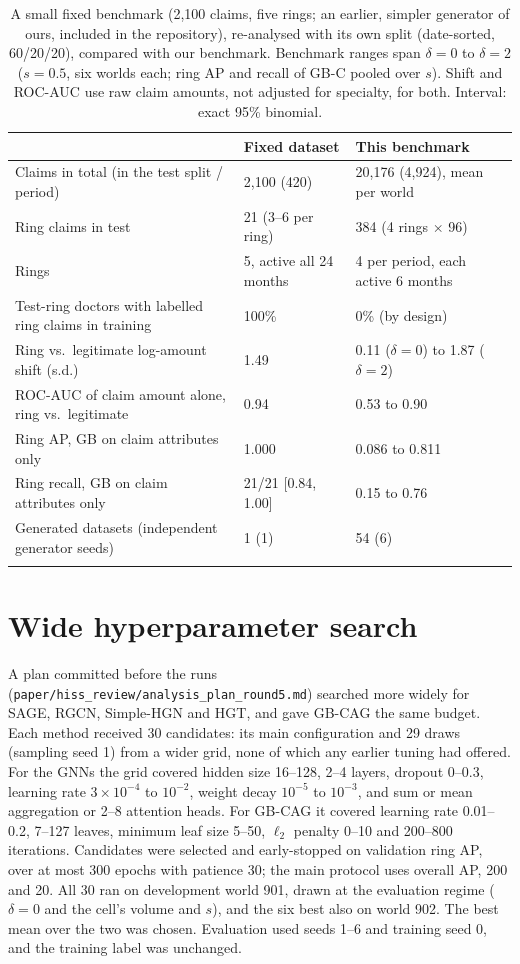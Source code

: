 \documentclass[pdflatex,sn-vancouver-num]{sn-jnl}
\begin{document}
\begin{table}[h]
\caption{A small fixed benchmark (2,100 claims, five rings; an earlier, simpler generator of ours, included in the repository), re-analysed with its own split (date-sorted, 60/20/20), compared with our benchmark. Benchmark ranges span $\delta=0$ to $\delta=2$ ($s=0.5$, six worlds each; ring AP and recall of GB-C pooled over $s$). Shift and ROC-AUC use raw claim amounts, not adjusted for specialty, for both. Interval: exact 95\% binomial.}\label{tab:legacy}
\scriptsize
\begin{tabular}{@{}p{5.0cm}p{3.1cm}p{3.6cm}@{}}
\toprule
 & Fixed dataset & This benchmark \\
\midrule
Claims in total (in the test split / period) & 2,100 (420) & 20,176 (4,924), mean per world \\
Ring claims in test & 21 (3--6 per ring) & 384 (4 rings $\times$ 96) \\
Rings & 5, active all 24 months & 4 per period, each active 6 months \\
Test-ring doctors with labelled ring claims in training & 100\% & 0\% (by design) \\
Ring vs.\ legitimate log-amount shift (s.d.) & 1.49 & 0.11 ($\delta=0$) to 1.87 ($\delta=2$) \\
ROC-AUC of claim amount alone, ring vs.\ legitimate & 0.94 & 0.53 to 0.90 \\
Ring AP, GB on claim attributes only & 1.000 & 0.086 to 0.811 \\
Ring recall, GB on claim attributes only & 21/21 [0.84, 1.00] & 0.15 to 0.76 \\
Generated datasets (independent generator seeds) & 1 (1) & 54 (6) \\
\botrule
\end{tabular}
\end{table}

\section{Wide hyperparameter search}\label{sec:s_wide}
A plan committed before the runs (\texttt{paper/\allowbreak hiss\_review/\allowbreak analysis\_plan\_round5.md}) searched more widely for SAGE,
RGCN, Simple-HGN and HGT, and gave GB-CAG the same budget. Each method received 30 candidates: its main configuration
and 29 draws (sampling seed 1) from a wider grid, none of which any earlier tuning had offered. For the GNNs the grid
covered hidden size 16--128, 2--4 layers, dropout 0--0.3, learning rate $3\times10^{-4}$ to $10^{-2}$, weight decay
$10^{-5}$ to $10^{-3}$, and sum or mean aggregation or 2--8 attention heads. For GB-CAG it covered learning rate
0.01--0.2, 7--127 leaves, minimum leaf size 5--50, $\ell_2$ penalty 0--10 and 200--800 iterations. Candidates were
selected and early-stopped on validation ring AP, over at most 300 epochs with patience 30; the main protocol uses
overall AP, 200 and 20. All 30 ran on development world 901, drawn at the evaluation regime ($\delta=0$ and the
cell's volume and $s$), and the six best also on world 902. The best mean over the two was chosen. Evaluation used seeds
1--6 and training seed 0, and the training label was unchanged.
\end{document}
